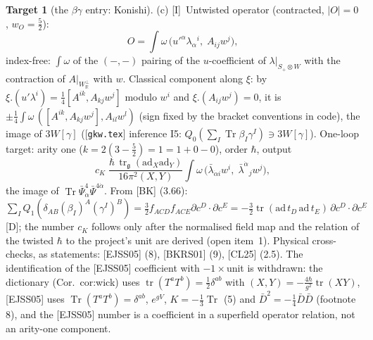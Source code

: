 \documentclass[11pt]{article}
\theoremstyle{definition}
\newtheorem{target}{Target}
\newcommand{\Tr}{\operatorname{Tr}}
\newcommand{\tr}{\operatorname{tr}}
\newcommand{\Dl}{\textup{[D]}}
\newcommand{\Il}{\textup{[I]}}
\newcommand{\unit}{\dfrac{\hbar\,\tr_{\mathfrak g}(\mathrm{ad}_X\mathrm{ad}_Y)}{16\pi^2(X,Y)}}
\begin{document}
\begin{target}[the $\beta\gamma$ entry: Konishi]
(c) \Il\ Untwisted operator (contracted, $|O|=0$, $w_O=\tfrac52$):
\[
O=\int\omega\,\big(u'^\alpha\lambda_\alpha{}^i,\;A_{ij}w^j\big),
\]
index-free: $\int\omega$ of the $(-,-)$ pairing of the $u$-coefficient of $\lambda|_{S_+\otimes W}$ with the contraction of $A|_{W_{\mathbb R}^\perp}$ with $w$. Classical component along $\xi$: by $\xi.(u'\lambda^i)=\tfrac14[A^{ik},A_{kj}w^j]$ modulo $w^i$ and $\xi.(A_{ij}w^j)=0$, it is $\pm\tfrac14\int\omega\,([A^{ik},A_{kj}w^j],A_{il}w^l)$ (sign fixed by the bracket conventions in code), the image of $3W[\gamma]$ ([\texttt{gkw.tex}] inference I5: $Q_0(\sum_I\Tr\beta_I\gamma^I)\ni3W[\gamma]$). One-loop target: arity one ($k=2(3-\tfrac52)=1=1+0-0$), order $\hbar$, output
\[
c_K\;\unit\int\omega\,\big(\bar\lambda_{\dot\alpha i}w^i,\;\bar\lambda^{\dot\alpha}{}_jw^j\big),
\]
the image of $\Tr\bar\Psi^4_{\dot\alpha}\bar\Psi^{4\dot\alpha}$. From [BK] (3.66): $\sum_IQ_1(\delta_{AB}(\beta_I)^A(\gamma^I)^B)=\tfrac32f_{ACD}f_{ACE}\partial c^D\cdot\partial c^E=-\tfrac32\tr(\mathrm{ad}\,t_D\,\mathrm{ad}\,t_E)\,\partial c^D\cdot\partial c^E$ \Dl; the number $c_K$ follows only after the normalised field map and the relation of the twisted $\hbar$ to the project's unit are derived (open item~1). Physical cross-checks, as statements: [EJSS05] (8), [BKRS01] (9), [CL25] (2.5). The identification of the [EJSS05] coefficient with $-1\times$unit is withdrawn: the dictionary (Cor.~cor:wick) uses $\tr(T^aT^b)=\frac12\delta^{ab}$ with $(X,Y)=-\frac{4\hbar}{g^2}\tr(XY)$, [EJSS05] uses $\Tr(T^aT^b)=\delta^{ab}$, $e^{gV}$, $K=-\frac13\Tr$ (5) and $\bar D^2=-\frac14\bar D\bar D$ (footnote 8), and the [EJSS05] number is a coefficient in a superfield operator relation, not an arity-one component.


\end{target}
\end{document}
